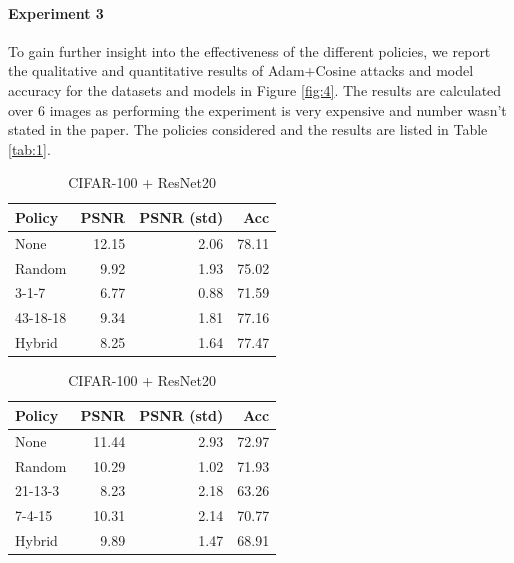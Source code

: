 \paragraph{Experiment 3}

To gain further insight into the effectiveness of the different policies, we report the qualitative and quantitative results of Adam+Cosine attacks and model accuracy for the datasets and models in Figure \ref{fig:4}. The results are calculated over $6$ images as performing the experiment is very expensive and number wasn't stated in the paper. The policies considered and the results are listed in Table \ref{tab:1}.
\begin{center}
\begin{table}[h]
    \begin{subtable}[h]{0.25\textwidth}
      \begin{tabular}{lrrr}
            \hline
             Policy   &   PSNR &   PSNR (std) &   Acc \\
            \hline
             None     &       12.15 &       2.06 & 78.11 \\
             Random   &        9.92 &       1.93 & 75.02 \\
             3-1-7    &        6.77 &       0.88 & 71.59 \\
             43-18-18 &        9.34 &       1.81 & 77.16 \\
             Hybrid   &        8.25 &       1.64 & 77.47 \\
            \hline
        \end{tabular}
        \caption{CIFAR-100 + ResNet20}
    \end{subtable}
    \hspace{40mm}%
    \begin{subtable}[h]{0.25\textwidth}
        \begin{tabular}{lrrr}
            \hline
             Policy   &   PSNR &   PSNR (std) &   Acc \\
            \hline
             None     &       11.44 &       2.93 & 72.97 \\
             Random   &       10.29 &       1.02 & 71.93 \\
             21-13-3  &        8.23 &       2.18 & 63.26 \\
             7-4-15   &       10.31 &       2.14 & 70.77 \\
             Hybrid   &        9.89 &       1.47 & 68.91 \\
            \hline
        \end{tabular}

\end{subtable}
\end{table}
\end{center}
